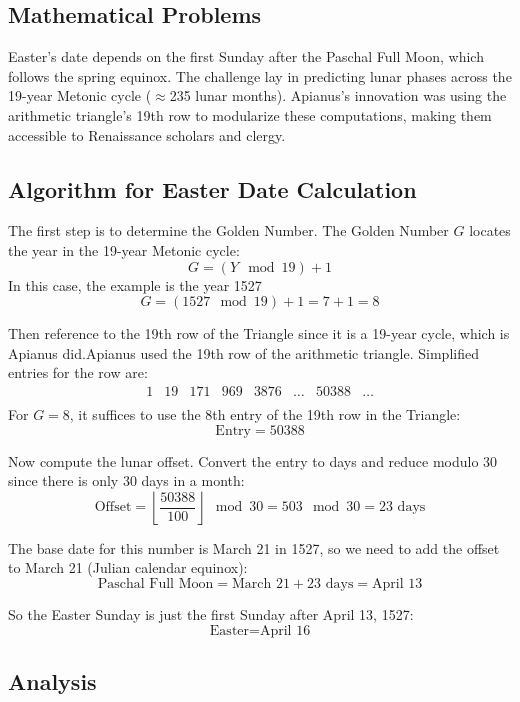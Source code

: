 \documentclass{article}
\begin{document}
\subsection{Mathematical Problems}

 Easter’s date depends on the first Sunday after the Paschal Full Moon, which follows the spring equinox.\cite{apianus1527} The challenge lay in predicting lunar phases across the 19-year Metonic cycle ($\approx$235 lunar months). Apianus’s innovation was using the arithmetic triangle’s 19th row to modularize these computations, making them accessible to Renaissance scholars and clergy. \cite{boyer1950}

\subsection{Algorithm for Easter Date Calculation}

The first step is to determine the Golden Number. The Golden Number \( G \) locates the year in the 19-year Metonic cycle:
\[
G = (Y \mod 19) + 1
\]
In this case, the example is the year 1527
\[
G = (1527 \mod 19) + 1 = 7 + 1 = 8
\]

Then reference to the 19th row of the Triangle since it is a 19-year cycle, which is Apianus did.Apianus used the 19th row of the arithmetic triangle. Simplified entries for the row are:
\[
\begin{array}{cccccccc}
1 & 19 & 171 & 969 & 3876 & \ldots & 50388 & \ldots \\
\end{array}
\]
For \( G = 8 \), it suffices to use the 8th entry of the 19th row in the Triangle:
\[
\text{Entry} = 50388
\]

Now compute the lunar offset. Convert the entry to days and reduce modulo 30 since there is only 30 days in a month:
\[
\text{Offset} = \left\lfloor \frac{50388}{100} \right\rfloor \mod 30 = 503 \mod 30 = 23 \text{ days}
\]

The base date for this number is March 21 in 1527, so we need to add the offset to March 21 (Julian calendar equinox):
\[
\text{Paschal Full Moon} = \text{March 21} + 23 \text{ days} = \text{April 13}
\]

So the Easter Sunday is just the first Sunday after April 13, 1527:
\[
\text{Easter} = \text{April 16}
\]

\subsection{Analysis}
\end{document}
